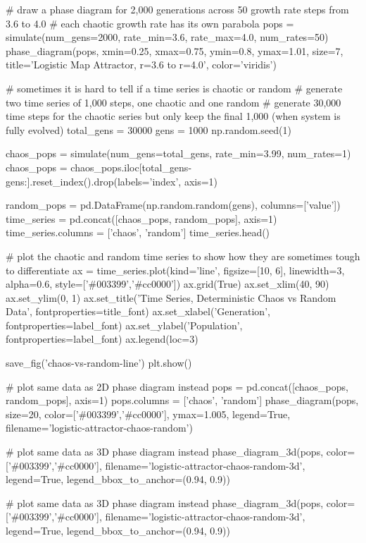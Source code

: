 \documentclass[a4paper,12pt]{article}
\begin{document}
\# draw a phase diagram for 2,000 generations across 50 growth rate steps from 3.6 to 4.0
\# each chaotic growth rate has its own parabola
pops = simulate(num\_gens=2000, rate\_min=3.6, rate\_max=4.0, num\_rates=50)
phase\_diagram(pops, xmin=0.25, xmax=0.75, ymin=0.8, ymax=1.01, size=7, 
              title='Logistic Map Attractor, r=3.6 to r=4.0', color='viridis')
              
\# sometimes it is hard to tell if a time series is chaotic or random
\# generate two time series of 1,000 steps, one chaotic and one random
\# generate 30,000 time steps for the chaotic series but only keep the final 1,000 (when system is fully evolved)
total\_gens = 30000
gens = 1000
np.random.seed(1)

chaos\_pops = simulate(num\_gens=total\_gens, rate\_min=3.99, num\_rates=1)
chaos\_pops = chaos\_pops.iloc[total\_gens-gens:].reset\_index().drop(labels='index', axis=1)

random\_pops = pd.DataFrame(np.random.random(gens), columns=['value'])
time\_series = pd.concat([chaos\_pops, random\_pops], axis=1)
time\_series.columns = ['chaos', 'random']
time\_series.head()

\# plot the chaotic and random time series to show how they are sometimes tough to differentiate
ax = time\_series.plot(kind='line', figsize=[10, 6], linewidth=3, alpha=0.6, style=['\#003399','\#cc0000'])
ax.grid(True)
ax.set\_xlim(40, 90)
ax.set\_ylim(0, 1)
ax.set\_title('Time Series, Deterministic Chaos vs Random Data', fontproperties=title\_font)
ax.set\_xlabel('Generation', fontproperties=label\_font)
ax.set\_ylabel('Population', fontproperties=label\_font)
ax.legend(loc=3)

save\_fig('chaos-vs-random-line')
plt.show()

\# plot same data as 2D phase diagram instead
pops = pd.concat([chaos\_pops, random\_pops], axis=1)
pops.columns = ['chaos', 'random']
phase\_diagram(pops, size=20, color=['\#003399','\#cc0000'], ymax=1.005, legend=True, 
              filename='logistic-attractor-chaos-random')
              
\# plot same data as 3D phase diagram instead
phase\_diagram\_3d(pops, color=['\#003399','\#cc0000'], filename='logistic-attractor-chaos-random-3d',
                 legend=True, legend\_bbox\_to\_anchor=(0.94, 0.9))
                 
\# plot same data as 3D phase diagram instead
phase\_diagram\_3d(pops, color=['\#003399','\#cc0000'], filename='logistic-attractor-chaos-random-3d',
                 legend=True, legend\_bbox\_to\_anchor=(0.94, 0.9))
\end{document}
